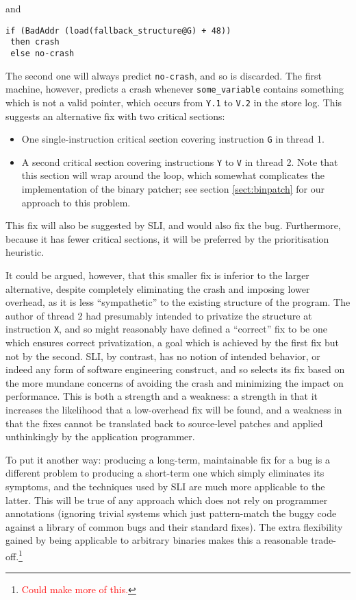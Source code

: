 \documentclass[10pt,twocolumn,preprint,natbib,authoryear]{sigplanconf}
\newcommand{\editorial}[1]{\textcolor{red}{\footnote{\textcolor{red}{#1}}}}
\begin{document}
and

\begin{verbatim}
if (BadAddr (load(fallback_structure@G) + 48))
 then crash
 else no-crash
\end{verbatim}

The second one will always predict \verb|no-crash|, and so is
discarded.  The first machine, however, predicts a crash whenever
\verb|some_variable| contains something which is not a valid pointer,
which occurs from \verb|Y.1| to \verb|V.2| in the store log.  This
suggests an alternative fix with two critical sections:

\begin{itemize}
\item One single-instruction critical section covering instruction
  \verb|G| in thread 1.
\item A second critical section covering instructions \verb|Y| to
  \verb|V| in thread 2.  Note that this section will wrap around the
  loop, which somewhat complicates the implementation of the binary
  patcher; see section \ref{sect:binpatch} for our approach to this
  problem.
\end{itemize}

This fix will also be suggested by SLI, and would also fix the bug.
Furthermore, because it has fewer critical sections, it will be
preferred by the prioritisation heuristic.

It could be argued, however, that this smaller fix is inferior to the
larger alternative, despite completely eliminating the crash and
imposing lower overhead, as it is less ``sympathetic'' to the existing
structure of the program.  The author of thread 2 had presumably
intended to privatize the structure at instruction \verb|X|, and so
might reasonably have defined a ``correct'' fix to be one which
ensures correct privatization, a goal which is achieved by the first
fix but not by the second.  SLI, by contrast, has no notion of
intended behavior, or indeed any form of software engineering
construct, and so selects its fix based on the more mundane concerns
of avoiding the crash and minimizing the impact on performance.  This
is both a strength and a weakness: a strength in that it increases the
likelihood that a low-overhead fix will be found, and a weakness in
that the fixes cannot be translated back to source-level patches and
applied unthinkingly by the application programmer.

To put it another way: producing a long-term, maintainable fix for a
bug is a different problem to producing a short-term one which simply
eliminates its symptoms, and the techniques used by SLI are much more
applicable to the latter.  This will be true of any approach which
does not rely on programmer annotations (ignoring trivial systems
which just pattern-match the buggy code against a library of common
bugs and their standard fixes).  The extra flexibility gained by being
applicable to arbitrary binaries makes this a reasonable
trade-off.\editorial{Could make more of this.}
\end{document}
